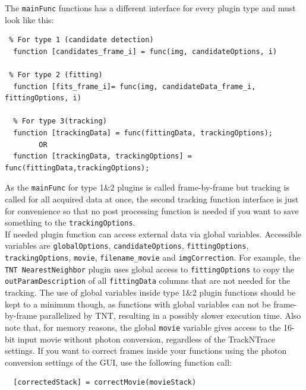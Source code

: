 \documentclass[11pt,onside]{report}
\numberwithin{equation}{chapter}
\begin{document}
 The \texttt{mainFunc} functions has  a different interface for every plugin type and must look like this:
\begin{verbatim}
 % For type 1 (candidate detection)
  function [candidates_frame_i] = func(img, candidateOptions, i)
  
 % For type 2 (fitting)
  function [fits_frame_i]= func(img, candidateData_frame_i, fittingOptions, i)
  
  % For type 3(tracking)
  function [trackingData] = func(fittingData, trackingOptions);
        OR
  function [trackingData, trackingOptions] = func(fittingData,trackingOptions);
\end{verbatim}
As the \texttt{mainFunc} for type 1\&2 plugins is called frame-by-frame but tracking is called for all acquired data at once, the second tracking function interface is just for convenience so that no post processing function is needed if you want to save something to the \texttt{trackingOptions}. \\

If needed plugin function can access external data via global variables. Accessible variables are \texttt{globalOptions}, \texttt{candidateOptions}, \texttt{fittingOptions}, \texttt{trackingOptions}, \texttt{movie}, \texttt{filename\_movie} and \texttt{imgCorrection}. For example, the \texttt{TNT NearestNeighbor} plugin uses global access to  \texttt{fittingOptions} to copy the \texttt{outParamDescription} of all \texttt{fittingData} columns that are not needed for the tracking. The use of global variables inside type 1\&2 plugin functions should be kept to a minimum though, as functions with global variables can not be frame-by-frame parallelized by TNT, resulting in a possibly slower execution time. Also note that, for memory reasons, the global \texttt{movie} variable gives access to the 16-bit input movie without photon conversion, regardless of the TrackNTrace settings. If you want to correct frames inside your functions using the photon conversion settings of the GUI, use the following function call:
\begin{verbatim}
  [correctedStack] = correctMovie(movieStack)
\end{verbatim}
\end{document}
